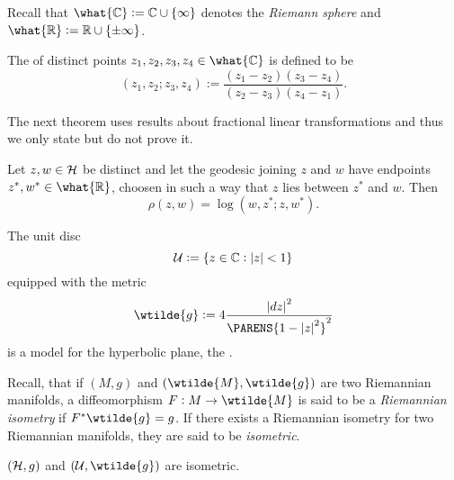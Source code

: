 Recall that $\what{\Cbb} := \Cbb \cup \cbr[0]{\infty}$ denotes the \emph{Riemann sphere} and $\what{\Rbb} := \Rbb \cup \cbr[0]{\pm\infty}$.

\begin{definition}
	The  of distinct points $z_1,z_2,z_3,z_4 \in \what{\Cbb}$ is defined to be
	\begin{equation}
		(z_1,z_2;z_3,z_4) := \frac{(z_1 - z_2)(z_3 - z_4)}{(z_2 - z_3)(z_4 - z_1)}.
	\end{equation}
\end{definition}

The next theorem uses results about fractional linear transformations and thus we only state but do not prove it.

\begin{theorem}
	Let $z,w \in \mathcal{H}$ be distinct and let the geodesic joining $z$ and $w$ have endpoints $z^*,w^* \in \what{\Rbb}$, choosen in such a way that $z$ lies between $z^*$ and $w$. Then
	\begin{equation}
		\rho(z,w) = \log (w,z^*;z,w^*).
	\end{equation}
\end{theorem}

\begin{definition}
	The unit disc 
	\begin{equation}
		\Ucal := \cbr[0]{z \in \Cbb : \abs[0]{z} < 1}
	\end{equation}
	\noindent equipped with the metric
	\begin{equation}
		\wtilde{g} := 4\frac{\abs[0]{dz}^2}{\PARENS{1 - \abs[0]{z}^2}^2}
	\end{equation}
	\noindent is a model for the hyperbolic plane, the .
\end{definition}

Recall, that if $(M,g)$ and $(\wtilde{M},\wtilde{g})$ are two Riemannian manifolds, a diffeomorphism $F : M \to \wtilde{M}$ is said to be a \emph{Riemannian isometry} if $F^* \wtilde{g} = g$. If there exists a Riemannian isometry for two Riemannian manifolds, they are said to be \emph{isometric}.

\begin{proposition}
	$(\mathcal{H}, g)$ and $(\Ucal, \wtilde{g})$ are isometric.
\end{proposition}

